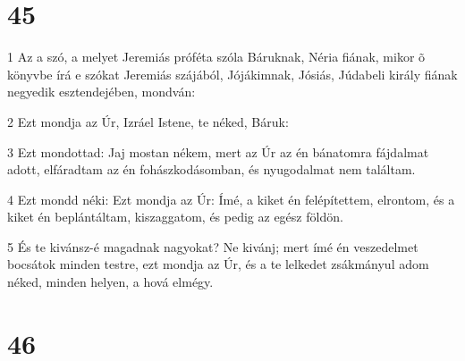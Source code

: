 \chapter{45}

\par 1 Az a szó, a melyet Jeremiás próféta szóla Báruknak, Néria fiának, mikor õ könyvbe írá e szókat Jeremiás szájából, Jójákimnak, Jósiás, Júdabeli király fiának negyedik esztendejében, mondván:
\par 2 Ezt mondja az Úr, Izráel Istene, te néked, Báruk:
\par 3 Ezt mondottad: Jaj mostan nékem, mert az Úr az én bánatomra fájdalmat adott, elfáradtam az én fohászkodásomban, és nyugodalmat nem találtam.
\par 4 Ezt mondd néki: Ezt mondja az Úr: Ímé, a kiket én felépítettem, elrontom, és a kiket én beplántáltam, kiszaggatom, és pedig az egész földön.
\par 5 És te kivánsz-é magadnak nagyokat? Ne kivánj; mert ímé én veszedelmet bocsátok minden testre, ezt mondja az Úr, és a te lelkedet zsákmányul adom néked, minden helyen, a hová elmégy.

\chapter{46}

